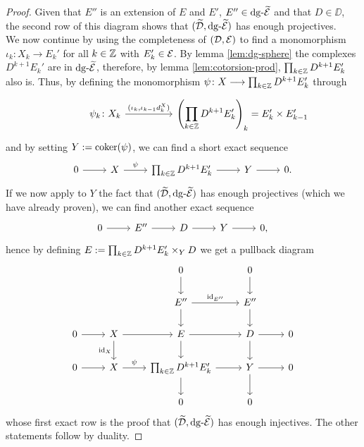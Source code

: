 \begin{proof}
    Given that $E''$ is an extension of $E$ and $E'$, $E'' \in \mathrm{dg} \text{-}\widetilde{\mathcal{E}}$ and that $D \in \DD$, the second row of this diagram shows that $(\widetilde{\mathcal{D}}, \mathrm{dg} \text{-}\widetilde{\mathcal{E}})$ has enough projectives. \\
    We now continue by using the completeness of $(\mathcal{D}, \mathcal{E})$ to find a monomorphism $\iota_k\colon X_k \longrightarrow E_k'$ for all $k \in \mathbb{Z}$ with $E_k' \in \mathcal{E}$. By lemma \ref{lem:dg-sphere} the complexes $D^{k+1}E_k'$ are in $\mathrm{dg} \text{-}\widetilde{\mathcal{E}}$, therefore, by lemma \ref{lem:cotorsion-prod}, $\prod_{k \in \mathbb{Z}} D^{k+1}E_k'$ also is. Thus, by defining the monomorphism $\psi \colon X \longrightarrow \prod_{k \in \mathbb{Z}} D^{k+1}E_k'$ through
    \[\begin{tikzcd}
        {} & {\psi_k\colon X_k} && {\left(\displaystyle\prod_{k \in \Z} D^{k+1}E_k' \right)_k = E_k'\times E_{k-1}'}
        \arrow["{(\iota_k, \iota_{k-1}d^X_k)}", from=1-2, to=1-4]
    \end{tikzcd}\]
    and by setting $Y := \operatorname{coker}(\psi)$, we can  find a short exact sequence 
    \[\begin{tikzcd}
        0 & X & {\prod_{k \in \Z} D^{k+1}E_k'} & Y & {0.}
        \arrow[from=1-1, to=1-2]
        \arrow["\psi", from=1-2, to=1-3]
        \arrow[from=1-3, to=1-4]
        \arrow[from=1-4, to=1-5]
    \end{tikzcd}\]
    If we now apply to $Y$ the fact that $(\widetilde{\mathcal{D}}, \mathrm{dg} \text{-}\widetilde{\mathcal{E}})$ has enough projectives (which we have already proven), we can find another exact sequence
    \[\begin{tikzcd}
        0 & {E''} & D & Y & {0,}
        \arrow[from=1-1, to=1-2]
        \arrow[from=1-2, to=1-3]
        \arrow[from=1-3, to=1-4]
        \arrow[from=1-4, to=1-5]
    \end{tikzcd}\]
    hence by defining $E := {\prod_{k \in \mathbb{Z}} D^{k+1}E_k'} \times_Y D$ we get a pullback diagram
    \[\begin{tikzcd}
        && 0 & 0 & \\
        && {E''} & {E''} \\
        0 & X & E & D & 0 \\
        0 & X & {\prod_{k \in \Z} D^{k+1}E_k'} & Y & 0 \\
        & {} & 0 & 0
        \arrow[from=1-3, to=2-3]
        \arrow[from=1-4, to=2-4]
        \arrow["{\id_{E''}}", from=2-3, to=2-4]
        \arrow[from=2-3, to=3-3]
        \arrow[from=2-4, to=3-4]
        \arrow[from=3-1, to=3-2]
        \arrow[from=3-2, to=3-3]
        \arrow["{\id_X}"', from=3-2, to=4-2]
        \arrow[from=3-3, to=3-4]
        \arrow[from=3-3, to=4-3]
        \arrow[from=3-4, to=3-5]
        \arrow[from=3-4, to=4-4]
        \arrow[from=4-1, to=4-2]
        \arrow["\psi", from=4-2, to=4-3]
        \arrow[from=4-3, to=4-4]
        \arrow[from=4-3, to=5-3]
        \arrow[from=4-4, to=4-5]
        \arrow[from=4-4, to=5-4]
    \end{tikzcd}\]
    whose first exact row is the proof that $(\widetilde{\mathcal{D}}, \mathrm{dg} \text{-}\widetilde{\mathcal{E}})$ has enough injectives.
    The other statements follow by duality.

\end{proof}

